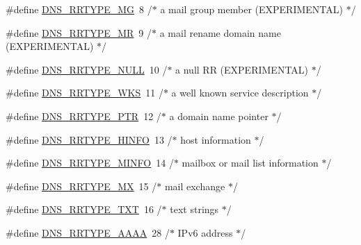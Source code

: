 \begin{DoxyCompactItemize}
\item 
\#define \hyperlink{openmote-cc2538_2lwip_2src_2include_2lwip_2prot_2dns_8h_a102558e1400d41a35868f82c7eba8503}{D\+N\+S\+\_\+\+R\+R\+T\+Y\+P\+E\+\_\+\+MG}~8     /$\ast$ a mail group member (E\+X\+P\+E\+R\+I\+M\+E\+N\+T\+AL) $\ast$/
\item 
\#define \hyperlink{openmote-cc2538_2lwip_2src_2include_2lwip_2prot_2dns_8h_a2d4fdfd7f5d8f9f758278003dc243d04}{D\+N\+S\+\_\+\+R\+R\+T\+Y\+P\+E\+\_\+\+MR}~9     /$\ast$ a mail rename domain name (E\+X\+P\+E\+R\+I\+M\+E\+N\+T\+AL) $\ast$/
\item 
\#define \hyperlink{openmote-cc2538_2lwip_2src_2include_2lwip_2prot_2dns_8h_aaa883ee62a659bdde6207d737e77795c}{D\+N\+S\+\_\+\+R\+R\+T\+Y\+P\+E\+\_\+\+N\+U\+LL}~10    /$\ast$ a null RR (E\+X\+P\+E\+R\+I\+M\+E\+N\+T\+AL) $\ast$/
\item 
\#define \hyperlink{openmote-cc2538_2lwip_2src_2include_2lwip_2prot_2dns_8h_aa64d1579e0da263c09134d12c89c9ce4}{D\+N\+S\+\_\+\+R\+R\+T\+Y\+P\+E\+\_\+\+W\+KS}~11    /$\ast$ a well known service description $\ast$/
\item 
\#define \hyperlink{openmote-cc2538_2lwip_2src_2include_2lwip_2prot_2dns_8h_ace55462cfcd4872a7c68178ed779cb89}{D\+N\+S\+\_\+\+R\+R\+T\+Y\+P\+E\+\_\+\+P\+TR}~12    /$\ast$ a domain name pointer $\ast$/
\item 
\#define \hyperlink{openmote-cc2538_2lwip_2src_2include_2lwip_2prot_2dns_8h_aa38f49c344b6aa0caa6656dbc4f1b7c6}{D\+N\+S\+\_\+\+R\+R\+T\+Y\+P\+E\+\_\+\+H\+I\+N\+FO}~13    /$\ast$ host information $\ast$/
\item 
\#define \hyperlink{openmote-cc2538_2lwip_2src_2include_2lwip_2prot_2dns_8h_a952c8c700b3ddad714e51873692a345b}{D\+N\+S\+\_\+\+R\+R\+T\+Y\+P\+E\+\_\+\+M\+I\+N\+FO}~14    /$\ast$ mailbox or mail list information $\ast$/
\item 
\#define \hyperlink{openmote-cc2538_2lwip_2src_2include_2lwip_2prot_2dns_8h_a52c933b4a3def47075a16ba3006d7f99}{D\+N\+S\+\_\+\+R\+R\+T\+Y\+P\+E\+\_\+\+MX}~15    /$\ast$ mail exchange $\ast$/
\item 
\#define \hyperlink{openmote-cc2538_2lwip_2src_2include_2lwip_2prot_2dns_8h_a62820cc2f56dd4fdd301729fa05b4f96}{D\+N\+S\+\_\+\+R\+R\+T\+Y\+P\+E\+\_\+\+T\+XT}~16    /$\ast$ text strings $\ast$/
\item 
\#define \hyperlink{openmote-cc2538_2lwip_2src_2include_2lwip_2prot_2dns_8h_ae533fbb9f59f4de915ed3ecb9ff24953}{D\+N\+S\+\_\+\+R\+R\+T\+Y\+P\+E\+\_\+\+A\+A\+AA}~28    /$\ast$ I\+Pv6 address $\ast$/
\item 

\end{DoxyCompactItemize}

